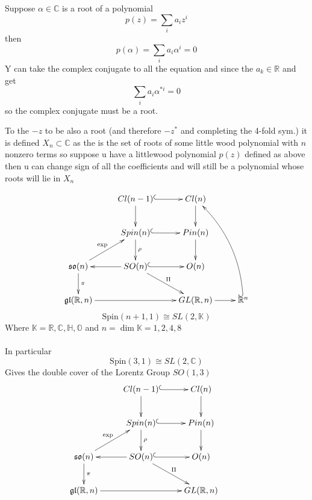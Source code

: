 \documentclass[12pt]{article}
\begin{document}
Suppose $\alpha \in \mathbb{C}$  is a root of a polynomial  $$p(z)=\sum_i a_i z^i$$ then 
$$p(\alpha) = \sum_i a_i \alpha^i=0$$ 
Y can take the complex conjugate to all the equation and since the $a_k\in \mathbb{R}$ and get
$$\sum_i a_i \alpha^{*i}=0$$
so the complex conjugate must be a root.

To the $-z$ to be also a root (and therefore $-z^*$ and completing the 4-fold sym.)  it is defined $X_n\subset \mathbb{C}$ as the is the set of roots of some little wood polynomial with $n$ nonzero terms so suppose u have a littlewood polynomial $p(z)$ defined as above then u can change sign of all the coefficients and will still be a polynomial whose roots will lie in $X_n$



\begin{equation}
    \xymatrix{
&Cl(n-1) \ar@{^(->}[r], \ar@{->}[d] & Cl(n) \ar@{->}[d]& \\ 
&Spin(n)\ar@{->}[d]^{\rho}    \ar@{^(->}[r] & Pin(n) \ar@{->}[d]& \\
\mathfrak{s}\mathfrak{o}(n) \ar@{->}[ur]^{\exp} \ar@{->}[d]^{\pi}   &SO(n) \ar@{^(->}[r], \ar@{->}[l], \ar@{->}[dr]^{\Pi}   & O(n) &\\
\mathfrak{g}\mathfrak{l}(\mathbb{R},n) \ar@{->}[rr]& & GL(\mathbb{R},n) \ar@{->}[r] & \mathbb{R}^n \ar@{^(->}@/_{5mm}/[uuul]
}
\end{equation}
\newpage
\begin{equation*}
    \text{Spin}(n+1,1)\cong SL(2,\mathbb{K}) 
\end{equation*}
Where $\mathbb{K}=\mathbb{R},\mathbb{C}, \mathbb{H}, \mathbb{O}$ and $n=\dim \mathbb{K}=1, 2, 4, 8$
\\\\
In particular 
\begin{equation*}
    \text{Spin}(3,1)\cong SL(2,\mathbb{C}) 
\end{equation*}
Gives the double cover of the Lorentz Group $SO(1,3)$
\begin{equation}
    \xymatrix{
&Cl(n-1) \ar@{^(->}[r], \ar@{->}[d] & Cl(n) \ar@{->}[d]& \\ 
&Spin(n)\ar@{->}[d]^{\rho}    \ar@{^(->}[r] & Pin(n) \ar@{->}[d]& \\
\mathfrak{s}\mathfrak{o}(n) \ar@{->}[ur]^{\exp} \ar@{->}[d]^{\pi}   &SO(n) \ar@{^(->}[r], \ar@{->}[l], \ar@{->}[dr]^{\Pi}   & O(n) &\\
\mathfrak{g}\mathfrak{l}(\mathbb{R},n) \ar@{->}[rr]& & GL(\mathbb{R},n)
}
\end{equation}
\newpage
\end{document}
